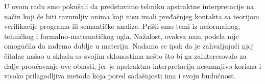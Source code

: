 U ovom radu smo pokušali da predstavimo tehniku apstraktne interpretacije na način koji će biti razumljiv onima koji nisu imali pređašnjeg kontakta sa teorijom verifikacije programa ili semantičke analize. Prišli smo temi iz neformalnog, tehničkog i formalno-matematičkog ugla. Nažalost, ovakva nam podela nije omogućila da zađemo dublje u materiju. Nadamo se ipak da je zahvaljujući njoj čitalac našao u skladu sa svojim sklonostima nešto što bi ga zainteresovalo za dalje proučavanje ove oblasti, jer je apstraktna interpretacija nesumnjivo korisna i visoko prilagodljiva metoda koja pored sadašnjosti ima i svoju budućnost.